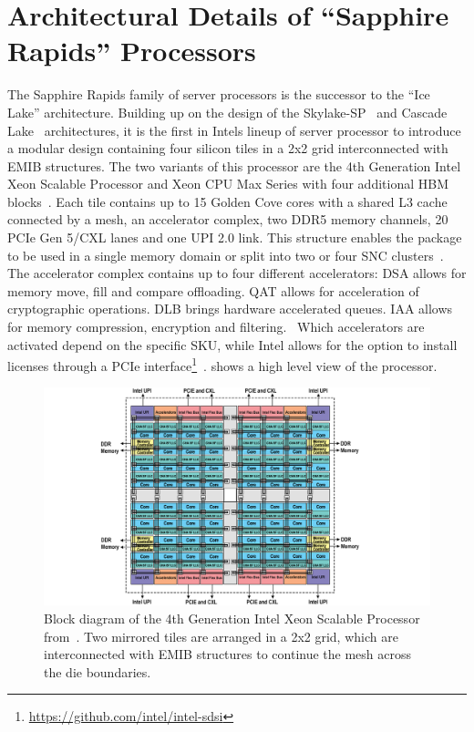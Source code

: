 \chapter{Architectural Details of ``Sapphire Rapids'' Processors}
\label{sec:arch}
The Sapphire Rapids family of server processors is the successor to the ``Ice Lake'' architecture.
Building up on the design of the Skylake-SP~\cite{Schoene_2019_SKL} and Cascade Lake~\cite{Velten_2022_Rome_CLX} architectures, it is the first in Intels lineup of server processor to introduce a modular design containing four silicon tiles in a 2x2 grid interconnected with \ac{EMIB} structures.
The two variants of this processor are the 4th Generation Intel Xeon Scalable Processor and Xeon CPU Max Series with four additional \ac{HBM} blocks~\cite{Intel_2021_Hotchips}.
Each tile contains up to 15 Golden Cove cores with a shared L3 cache connected by a mesh, an accelerator complex, two \ac{DDR5} memory channels, 20 \ac{PCIe} Gen 5/\ac{CXL} lanes and one \ac{UPI} 2.0 link.
This structure enables the package to be used in a single memory domain or split into two or four \ac{SNC} clusters~\cite{Intel_4th_gen_scalable}.
The accelerator complex contains up to four different accelerators:
\ac{DSA} allows for memory move, fill and compare offloading.
\ac{QAT} allows for acceleration of cryptographic operations.
\ac{DLB} brings hardware accelerated queues.
\ac{IAA} allows for memory compression, encryption and filtering.~\cite{Yifan_2024_intel_accelerator_ecosystem,Yuan_2023_ISCA_tutorial,Intel_4th_gen_scalable}
Which accelerators are activated depend on the specific \ac{SKU}, while Intel allows for the option to install licenses through a \ac{PCIe} interface\footnote{\url{https://github.com/intel/intel-sdsi}}~\cite{Krenn_2025_Intel_on_demand}.
 shows a high level view of the processor.

\begin{figure}[]
    \centering
    \includegraphics[width=\columnwidth]{fig/spr-uma.png}
    \caption{\label{fig:spr-overview}Block diagram of the 4th Generation Intel Xeon Scalable Processor from~\cite{Intel_4th_gen_scalable}.
Two mirrored tiles are arranged in a 2x2 grid, which are interconnected with \ac{EMIB} structures to continue the mesh across the die boundaries.~\cite{Intel_2022_ISSCC}}
\end{figure}

